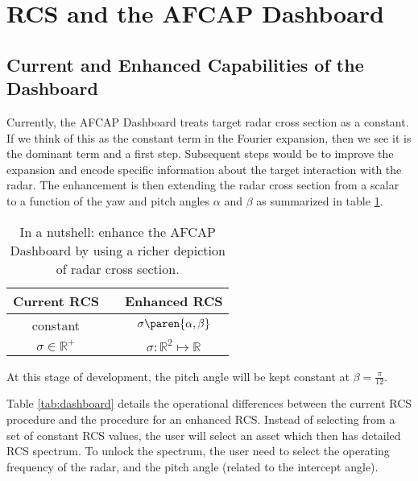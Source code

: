 % 

\section{RCS and the AFCAP Dashboard}

\subsection{Current and Enhanced Capabilities of the Dashboard}
Currently, the AFCAP Dashboard treats target radar cross section as a constant. If we think of this as the constant term in the Fourier expansion, then we see it is the dominant term and a first step. Subsequent steps would be to improve the expansion and encode specific information about the target interaction with the radar. The enhancement is then extending the radar cross section from a scalar to a function of the yaw and pitch angles $\alpha$ and $\beta$ as summarized in table \ref{tab:current-enhanced}.

\begin{table}
	\begin{center}
		\begin{tabular}{ccc}
			Current RCS && Enhanced RCS \\\hline
			constant && $\sigma \paren{ \alpha, \beta }$ \\
			$\sigma\in\mathbb{R}^{+}$ && $\sigma\colon\mathbb{R}^{2}\mapsto\mathbb{R}$ \\
		\end{tabular}
	\end{center}
\caption{In a nutshell: enhance the AFCAP Dashboard by using a richer depiction of radar cross section.}
\label{tab:current-enhanced}
\end{table}

At this stage of development, the pitch angle will be kept constant at $\beta=\tfrac{\pi}{12}$.

Table \ref{tab:dashboard} details the operational differences between the current RCS procedure and the procedure for an enhanced RCS. Instead of selecting from a set of constant RCS values, the user will select an asset which then has detailed RCS spectrum. To unlock the spectrum, the user need to select the operating frequency of the radar, and the pitch angle (related to the intercept angle).

